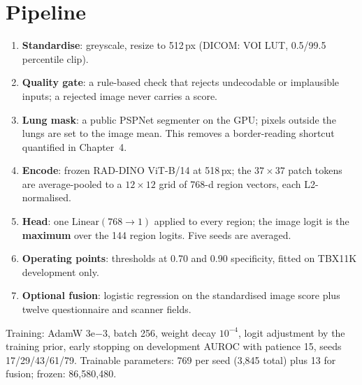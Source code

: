 \documentclass[12pt,a4paper]{report}
\begin{document}
\section{Pipeline}
\begin{enumerate}[leftmargin=1.6em,itemsep=1pt]
\item \textbf{Standardise}: greyscale, resize to 512\,px (DICOM: VOI LUT, 0.5/99.5 percentile clip).
\item \textbf{Quality gate}: a rule-based check that rejects undecodable or implausible inputs; a rejected image never carries a score.
\item \textbf{Lung mask}: a public PSPNet segmenter on the GPU; pixels outside the lungs are set to the image mean. This removes a border-reading shortcut quantified in Chapter~4.
\item \textbf{Encode}: frozen RAD-DINO ViT-B/14 at 518\,px; the $37\times37$ patch tokens are average-pooled to a $12\times12$ grid of 768-d region vectors, each L2-normalised.
\item \textbf{Head}: one $\mathrm{Linear}(768\to1)$ applied to every region; the image logit is the \textbf{maximum} over the 144 region logits. Five seeds are averaged.
\item \textbf{Operating points}: thresholds at 0.70 and 0.90 specificity, fitted on TBX11K development only.
\item \textbf{Optional fusion}: logistic regression on the standardised image score plus twelve questionnaire and scanner fields.
\end{enumerate}
Training: AdamW $3\mathrm{e}{-3}$, batch 256, weight decay $10^{-4}$, logit adjustment by the training prior, early stopping on development AUROC with patience 15, seeds 17/29/43/61/79. Trainable parameters: 769 per seed (3,845 total) plus 13 for fusion; frozen: 86,580,480.
\end{document}
